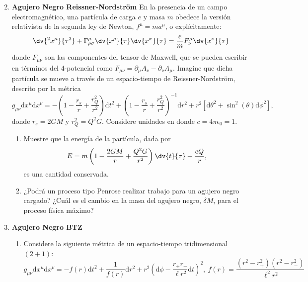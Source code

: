 \documentclass[../main]{subfiles}
\begin{document}
\begin{enumerate}
\begin{enumerate}[label=(\alph*)]
\begin{equation}
        \end{equation}
    \end{enumerate}
    \item \textbf{Agujero Negro Reissner-Nordström}
    En la presencia de un campo electromagnético, una partícula de carga $e$ y masa $m$ obedece la versión relativista de la segunda ley de Newton, $f^{\mu}=ma^{\mu}$, o explícitamente:
    \begin{equation}
        \dv{^2 x^{\mu}}{\tau^2}+\Gamma^{\mu}_{\rho\sigma}\dv{x^{\rho}}{\tau}\dv{x^{\sigma}}{\tau}=\dfrac{e}{m}F^{\mu}_{\nu}\dv{x^{\nu}}{\tau}
    \end{equation}
    donde $F_{\mu\nu}$ son las componentes del tensor de Maxwell, que se pueden escribir en términos del 4-potencial como $F_{\mu\nu}=\partial_{\mu}A_{\nu}-\partial_{\nu}A_{\mu}$. Imagine que dicha partícula se mueve a través de un espacio-tiempo de Reissner-Nordström, descrito por la métrica 
    \begin{equation}
        g_{\mu\nu}\mathrm{d}x^{\mu}\mathrm{d}x^{\nu}=-\left(1-\dfrac{r_s}{r}+\dfrac{r^2_Q}{r^2}\right)\mathrm{d}t^2+\left(1-\dfrac{r_s}{r}+\dfrac{r^2_Q}{r^2}\right)^{-1}\mathrm{d}r^2+r^2\left[\mathrm{d}\theta^2+\sin^2(\theta)\mathrm{d}\phi^2\right],
    \end{equation}
    donde $r_s=2GM$ y $r^2_Q=Q^2G$. Considere unidades en donde $c=4\pi \epsilon_0=1$.
    \begin{enumerate}[label=(\alph*)]
        \item Muestre que la energía de la partícula, dada por 
        \begin{equation}
            E=m\left(1-\dfrac{2GM}{r}+\dfrac{Q^2 G}{r^2}\right)\dv{t}{\tau}+\dfrac{eQ}{r},
        \end{equation}
        es una cantidad conservada.
        \item ¿Podrá un proceso tipo Penrose realizar trabajo para un agujero negro cargado? ¿Cuál es el cambio en la masa del agujero negro, $\delta M$, para el proceso física máximo?
    \end{enumerate}
    \item \textbf{Agujero Negro BTZ}
    \begin{enumerate}[label=(\alph*)]
        \item Considere la siguiente métrica de un espacio-tiempo tridimensional $(2+1)$:
        \begin{equation}
            g_{\mu\nu}\mathrm{d}x^{\mu}\mathrm{d}x^{\nu}=-f(r)\mathrm{d}t^2+\dfrac{1}{f(r)}\mathrm{d}r^2+r^2\left(\mathrm{d}\phi-\dfrac{r_{+}r_{-}}{\ell r^2}\mathrm{d}t\right)^2, \ f(r)=\dfrac{(r^2-r^2_+)(r^2-r^2_-)}{\ell^2 r^2}

\end{equation}
\end{enumerate}
\end{enumerate}
\end{document}
